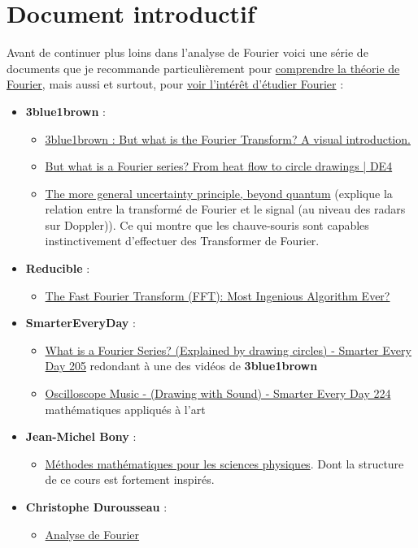 \documentclass[a4paper]{book}
\begin{document}
\chapter{Document introductif}
Avant de continuer plus loins dans l'analyse de Fourier voici une série de
documents que je recommande particulièrement pour \underline{comprendre la
théorie de Fourier}, mais aussi et surtout, pour \underline{voir l'intérêt
d'étudier Fourier} :
\begin{itemize}
	\item \textbf{3blue1brown} :
		\begin{itemize}
			\item \href{https://www.youtube.com/watch?v=spUNpyF58BY}
				{3blue1brown : But what is the Fourier Transform? 
				A visual introduction.}
			\item \href{https://www.youtube.com/watch?v=r6sGWTCMz2k}{But
				what is a Fourier series? From heat flow to
				circle drawings | DE4}
			\item \href{https://www.youtube.com/watch?v=MBnnXbOM5S4}{The
				more general uncertainty principle, beyond
				quantum} (explique la relation entre la
				transformé de Fourier et le signal (au niveau
				des radars sur Doppler)). Ce qui montre que les
				chauve-souris sont capables instinctivement
				d'effectuer des Transformer de Fourier.
		\end{itemize}
	\item \textbf{Reducible} :
		\begin{itemize}
			\item \href{https://www.youtube.com/watch?v=h7apO7q16V0}{The
				Fast Fourier Transform (FFT): Most Ingenious
				Algorithm Ever?}
		\end{itemize}
	\item \textbf{SmarterEveryDay} :
		\begin{itemize}
			\item \href{https://www.youtube.com/watch?v=ds0cmAV-Yek}{
					What is a Fourier Series? (Explained by
					drawing circles) - Smarter Every Day
					205} redondant à une des vidéos de
					\textbf{3blue1brown} 
			\item \href{https://www.youtube.com/watch?v=4gibcRfp4zA}{
					Oscilloscope Music - (Drawing with
					Sound) - Smarter Every Day 224} 
					mathématiques appliqués à l'art
		\end{itemize}
	\item \textbf{Jean-Michel Bony} :
		\begin{itemize}
			\item \underline{Méthodes mathématiques pour les sciences
				physiques}. Dont la structure de ce cours est
				fortement inspirés.
		\end{itemize}
	\item \textbf{Christophe Durousseau} :
		\begin{itemize}
			\item \underline{Analyse de Fourier}
		\end{itemize}
\end{itemize}
\end{document}
